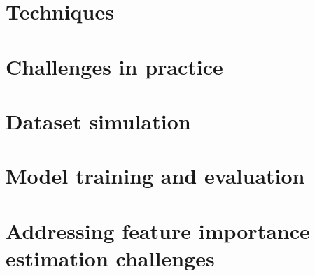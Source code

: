 \section{Techniques}
\label{sec:feature_importance_estimation_techniques}


\section{Challenges in practice}
\label{sec:feature_importance_estimation_challenges}


\section{Dataset simulation}
\label{sec:dataset_simulation}


\section{Model training and evaluation}
\label{sec:model_training_evaluation}


\section{Addressing feature importance estimation challenges}
\label{sec:addressing_feature_importance_estimation_challenges}